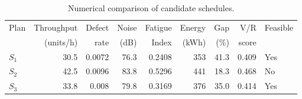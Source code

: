 \begin{table}[htbp]
\centering
\caption{Numerical comparison of candidate schedules.}
\label{tab:numerical-sim}
\small
\begin{tabular}{@{}lrrrrrrrl@{}}
\toprule
Plan & Throughput & Defect & Noise & Fatigue & Energy & Gap & V/R & Feasible \\
     & (units/h)  & rate   & (dB)  & Index   & (kWh)  & (\%) & score &         \\
\midrule
$S_{1}$ & 30.5 & 0.0072 & 76.3 & 0.2408 & 353 & 41.3 & 0.409 & Yes \\
$S_{2}$ & 42.5 & 0.0096 & 83.8 & 0.5296 & 441 & 18.3 & 0.468 & No \\
$S_{3}$ & 33.8 & 0.008 & 79.8 & 0.3169 & 376 & 35.0 & 0.414 & Yes \\
\bottomrule
\end{tabular}
\end{table}
